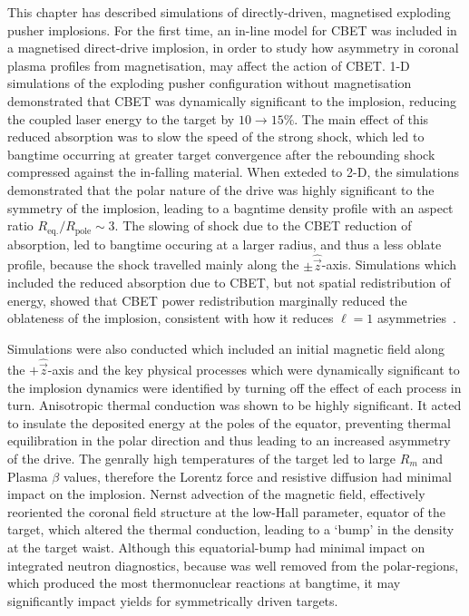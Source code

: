 This chapter has described simulations of directly-driven, magnetised exploding pusher implosions.
For the first time, an in-line model for \ac{CBET} was included in a magnetised direct-drive implosion, in order to study how asymmetry in coronal plasma profiles from magnetisation, may affect the action of \ac{CBET}.
1-D simulations of the exploding pusher configuration without magnetisation demonstrated that \ac{CBET} was dynamically significant to the implosion, reducing the coupled laser energy to the target by $10\rightarrow15\%$.
The main effect of this reduced absorption was to slow the speed of the strong shock, which led to bangtime occurring at greater target convergence after the rebounding shock compressed against the in-falling material.
When exteded to 2-D, the simulations demonstrated that the polar nature of the drive was highly significant to the symmetry of the implosion, leading to a bagntime density profile with an aspect ratio $R_{\text{eq.}}/R_{\text{pole}}\sim 3$.
The slowing of shock due to the \ac{CBET} reduction of absorption, led to bangtime occuring at a larger radius, and thus a less oblate profile, because the shock travelled mainly along the $\pm\hat{\vec{z}}$-axis.
Simulations which included the reduced absorption due to \ac{CBET}, but not spatial redistribution of energy, showed that \ac{CBET} power redistribution marginally reduced the oblateness of the implosion, consistent with how it reduces $\ell=1$ asymmetries~\cite{anderson_effect_2020}.

Simulations were also conducted which included an initial magnetic field along the $+\hat{\vec{z}}$-axis and the key physical processes which were dynamically significant to the implosion dynamics were identified by turning off the effect of each process in turn.
Anisotropic thermal conduction was shown to be highly significant.
It acted to insulate the deposited energy at the poles of the equator, preventing thermal equilibration in the polar direction and thus leading to an increased asymmetry of the drive.
The genrally high temperatures of the target led to large $R_m$ and Plasma $\beta$ values, therefore the Lorentz force and resistive diffusion had minimal impact on the implosion.
Nernst advection of the magnetic field, effectively reoriented the coronal field structure at the low-Hall parameter, equator of the target, which altered the thermal conduction, leading to a `bump' in the density at the target waist.
Although this equatorial-bump had minimal impact on integrated neutron diagnostics, because was well removed from the polar-regions, which produced the most thermonuclear reactions at bangtime, it may significantly impact yields for symmetrically driven targets.

